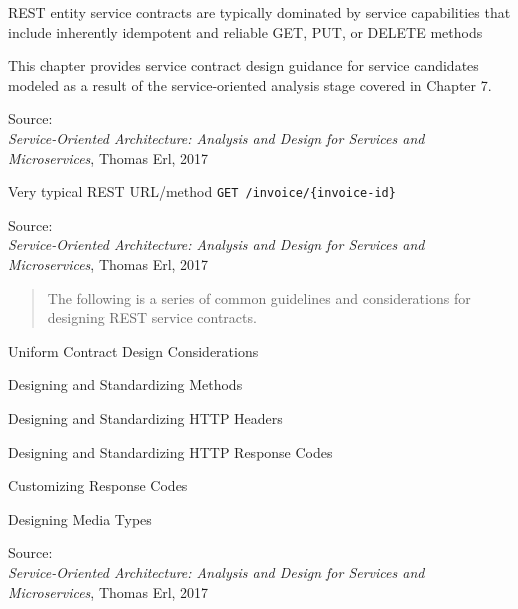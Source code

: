 \documentclass[Screen16to9,17pt]{foils}
\begin{document}
\begin{list2}
\item REST entity service contracts are typically dominated by service capabilities that include inherently idempotent and reliable GET, PUT, or DELETE methods
\item This chapter provides service contract design guidance for service candidates modeled as a result of the service-oriented analysis stage covered in Chapter 7.
\end{list2}
Source: {\footnotesize\\
\emph{Service‑Oriented Architecture: Analysis and Design for Services and Microservices}, Thomas Erl, 2017}







\begin{list2}
\item Very typical REST URL/method \verb+GET /invoice/{invoice-id}+
\end{list2}
Source: {\footnotesize\\
\emph{Service‑Oriented Architecture: Analysis and Design for Services and Microservices}, Thomas Erl, 2017}





\begin{quote}
The following is a series of common guidelines and considerations for designing REST service contracts.
\end{quote}


\begin{list2}
\item Uniform Contract Design Considerations
\item Designing and Standardizing Methods
\item Designing and Standardizing HTTP Headers
\item Designing and Standardizing HTTP Response Codes
\item Customizing Response Codes
\item Designing Media Types
\end{list2}
Source: {\footnotesize\\
\emph{Service‑Oriented Architecture: Analysis and Design for Services and Microservices}, Thomas Erl, 2017}


\end{document}
